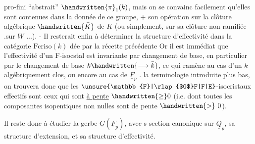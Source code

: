 
pro-fini ``abstrait'' $\handwritten{\pi}_1(k)$, mais on se convainc facilement qu'elles sont contenues dans la donnée de ce groupe, $+$ son opération sur la clôture algébrique $\handwritten{\bar{K}}$ de $K$ (ou simplement, sur sa clôture non ramifiée .sur $W$ ...). - Il resterait enfin à déterminer la structure d'effectivité dans la catégorie $\mathrm{Fcriso}(k)$ dée par la récette précédente Or il est immédiat que l'effectivité d'un F-isocstal est invariante par changement de base, en particulier par le changement de base $k\handwritten{\longrightarrow\bar{k}}$, ce qui ramène au cas d'un $k$ algébriquement clos, ou encore au cas de $\underline{F}_p$ .   la terminologie introduite plus bas, on trouvera donc que les $\unsure{\mathbb{F}|\rlap{$G$}F|F|E}$-isocristaux effectifs sont ceux qui sont \uline{à pente} $\handwritten{\geq}0$ (i.e. dont toutes les composantes isopentiques  non nulles sont de pente $\handwritten{>}\ 0$).

 Il reste donc à étudier la gerbe $\underline{G}(\underline{F}_p)$, avec s  section canonique sur $\underline{Q}_p$, sa structure d'extension, et sa structure d'effectivité.

